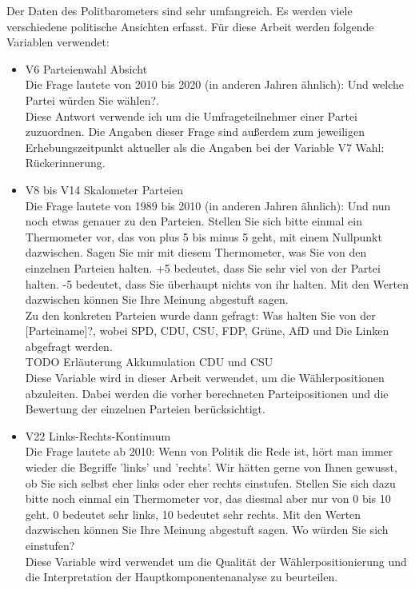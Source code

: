 Der Daten des Politbarometers sind sehr umfangreich. Es werden viele verschiedene politische Ansichten erfasst. Für diese Arbeit werden folgende Variablen verwendet:
\begin{itemize}
	\item V6 Parteienwahl Absicht\\
	Die Frage lautete von 2010 bis 2020 (in anderen Jahren ähnlich): \glqq Und welche Partei würden Sie wählen?\grqq.\\
	Diese Antwort verwende ich um die Umfrageteilnehmer einer Partei zuzuordnen. Die Angaben dieser Frage sind außerdem zum jeweiligen Erhebungszeitpunkt aktueller als die Angaben bei der Variable \glqq V7 Wahl: Rückerinnerung\grqq.

	\item V8 bis V14 Skalometer Parteien\\
	Die Frage lautete von 1989 bis 2010 (in anderen Jahren ähnlich): \glqq Und nun noch etwas genauer zu den Parteien. Stellen Sie sich bitte einmal ein Thermometer vor, das von plus 5 bis minus 5 geht, mit einem Nullpunkt dazwischen. Sagen Sie mir mit diesem Thermometer, was Sie von den einzelnen Parteien halten. +5 bedeutet, dass Sie sehr viel von der Partei halten. -5 bedeutet, dass Sie überhaupt nichts von ihr halten. Mit den Werten dazwischen können Sie Ihre Meinung abgestuft sagen.\grqq\\
	Zu den konkreten Parteien wurde dann gefragt: \glqq Was halten Sie von der [Parteiname]?\grqq, wobei SPD, CDU, CSU, FDP, Grüne, AfD und Die Linken abgefragt werden.\\
	TODO Erläuterung Akkumulation CDU und CSU\\
	Diese Variable wird in dieser Arbeit verwendet, um die Wählerpositionen abzuleiten. Dabei werden die vorher berechneten Parteipositionen und die Bewertung der einzelnen Parteien berücksichtigt.

	\item V22 Links-Rechts-Kontinuum\\
	Die Frage lautete ab 2010: \glqq Wenn von Politik die Rede ist, hört man immer wieder die Begriﬀe 'links' und 'rechts'. Wir hätten gerne von Ihnen gewusst, ob Sie sich selbst eher links oder eher rechts einstufen. Stellen Sie sich	dazu bitte noch einmal ein Thermometer vor, das diesmal aber nur von 0 bis 10 geht. 0 bedeutet sehr links, 10 bedeutet sehr rechts. Mit den Werten dazwischen können Sie Ihre Meinung abgestuft sagen. Wo würden Sie sich einstufen?\grqq\\
	Diese Variable wird verwendet um die Qualität der Wählerpositionierung  und die Interpretation der Hauptkomponentenanalyse zu beurteilen.
\end{itemize}

